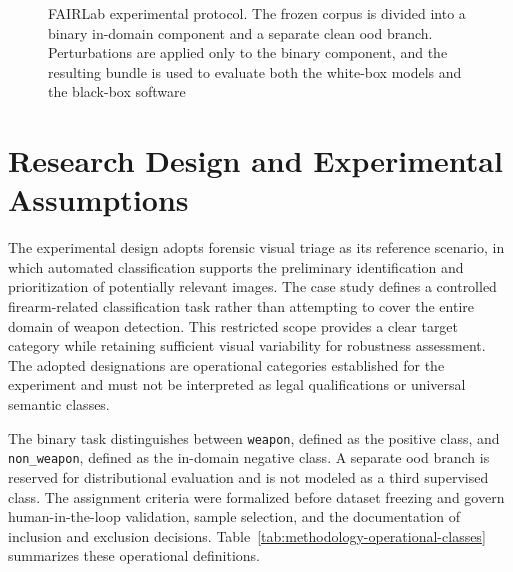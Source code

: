 \begin{figure}[H]
{%
}
\caption[FAIRLab experimental protocol]{FAIRLab experimental protocol. The
frozen corpus is divided into a binary in-domain component and a separate clean
\gls{ood} branch. Perturbations are applied only to the binary component, and
the resulting bundle is used to evaluate both the white-box models and the
black-box software}
\label{fig:methodology-fairlab-overview}
\end{figure}

\section{Research Design and Experimental Assumptions}
\label{sec:methodology-research-design}

The experimental design adopts forensic visual triage as its reference
scenario, in which automated classification supports the preliminary
identification and prioritization of potentially relevant images. The case
study defines a controlled firearm-related classification task rather than
attempting to cover the entire domain of weapon detection. This restricted
scope provides a clear target category while retaining sufficient visual
variability for robustness assessment. The adopted designations are operational
categories established for the experiment and must not be interpreted as legal
qualifications or universal semantic classes.

The binary task distinguishes between \texttt{weapon}, defined as the positive
class, and \texttt{non\_weapon}, defined as the in-domain negative class. A
separate \gls{ood} branch is reserved for distributional evaluation and is not
modeled as a third supervised class. The assignment criteria were formalized
before dataset freezing and govern human-in-the-loop validation, sample
selection, and the documentation of inclusion and exclusion decisions.
Table~\ref{tab:methodology-operational-classes} summarizes these operational
definitions.

